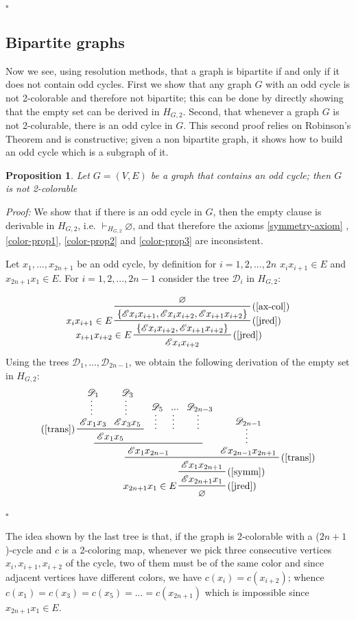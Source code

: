 \documentclass[a4paper,12pt,oneside]{book}
\newtheorem{proposition}[theorem]{Proposition}
\newcommand{\E}{\mathscr{E}}
\newcommand{\D}{\mathscr{D}}
\newcommand*{\QED}{\hfill\ensuremath{\square}}
\let\emptyset\varnothing
\begin{document}
\QED


\subsection*{Bipartite graphs}
Now we see, using resolution methods, that a graph is bipartite  if and only if it does not contain odd cycles. First we show that any graph $G$ with an odd cycle is not 2-colorable and therefore not bipartite; this can be done by directly showing that the empty set can be derived in $H_{G,2}$. 
Second, that whenever a graph $G$ is not 2-colurable, there is an odd cylce in $G$. This second proof relies on Robinson's Theorem and is constructive; given a non bipartite graph, it shows how to build an odd cycle which is a subgraph of it. 

\begin{proposition}
Let $G=(V,E)$ be a graph that contains an odd cycle; then $G$ is not 2-colorable 
\end{proposition}
\textit{Proof:}
We show that if there is an odd cycle in $G$, then the empty clause is derivable in $H_ {G,2}$, i.e. $\vdash_{H_{G,2}} \emptyset$, and that therefore the axioms \ref{symmetry-axiom} ,\ref{color-prop1}, \ref{color-prop2} and \ref{color-prop3} are inconsistent.

Let $x_1, ..., x_{2n+1} $ be an odd cycle, by definition for $i=1,2,..., 2n$ $x_i x_{i+1} \in E$ and $ x_{2n+1} x_1 \in E$. For $i=1,2,...,2n-1$ consider the tree $\D_i$ in $H_{G,2}$:

$$
\prftree[r,l]{(\ref{jred})}{$x_{i+1} x_{i+2} \in E$}{
\prftree[r,l]{(\ref{jred})}{$x_i x_{i+1} \in E$} 
{ \prftree[r]{(\ref{ax-col})}{\emptyset}
{\{\E x_i x_{i+1} , \E x_{i} x_{i+2} , \E x_{i+1} x_{i+2}\}}}
{\{ \E x_{i} x_{i+2} , \E x_{i+1} x_{i+2}  \}}
}
{\E x_i x_{i+2}}
$$
\newpage Using the trees $\D_1,...,\D_{2n-1}$, we obtain the following derivation of the empty set in $H_{G,2}$:
$$
\prftree[r,l]{(\ref{jred})}{$x_{2n+1}x_1\in E$}
{ \prftree[r]{(\ref{symm})}
{\prftree[r]{(\ref{trans})} 
{\prftree{ \prftree[l]{(\ref{trans})}{ \prfsummary{\D_1} {\E x_1x_3}  }{  \prfsummary{\D_3}{\E x_3x_5} }
{\E x_1 x_5}}{\prfsummary{ \D_5}{ }}{ \prfsummary{...}{} }{\prfsummary{ \D_{2n-3}}{ }}
{ \E x_1 x_{2n-1}}}{\prfsummary{\D_{2n-1}} { \E x_{2n-1}x_{2n+1}}}
{\E x_1 x_{2n+1} } }  
{\E x_{2n+1}x_1} }
{\emptyset}
$$
\QED

The idea shown by the last tree is that, if the graph is 2-colorable with a ($2n+1$)-cycle and $c$ is a 2-coloring map, whenever we pick three consecutive vertices $x_i,x_{i+1},x_{i+2}$ of the cycle, two of them must be of the same color and since adjacent vertices have different colors, we have $c(x_i)=c(x_{i+2})$; whence $c(x_1)=c(x_3)=c(x_5)=...=c(x_{2n+1})$ which is impossible since $x_{2n+1}x_1 \in E$.
\end{document}
